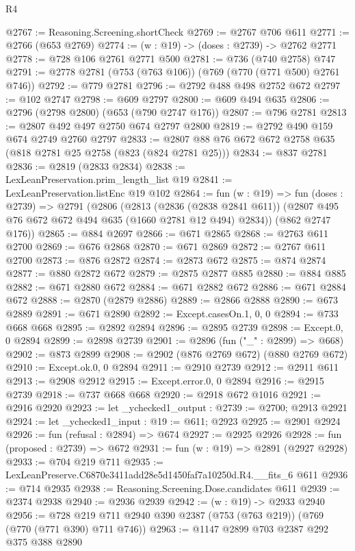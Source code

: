 \begin{lexlean}{R4}
\begin{coremodule}
@2767 := Reasoning.Screening.shortCheck
@2769 := @2767 @706 @611
@2771 := @2766 (@653 @2769)
@2774 := (w : @19) -> (doses : @2739) -> @2762 @2771
@2778 := @728 @106 @2761 @2771 @500
@2781 := @736 (@740 @2758) @747
@2791 := @2778 @2781 (@753 (@763 @106)) (@769 (@770 (@771 @500) @2761 @746))
@2792 := @779 @2781
@2796 := @2792 @488 @498 @2752 @672
@2797 := @102 @2747
@2798 := @609 @2797
@2800 := @609 @494 @635
@2806 := @2796 (@2798 @2800) (@653 (@790 @2747 @176))
@2807 := @796 @2781
@2813 := @2807 @492 @497 @2750 @674 @2797 @2800
@2819 := @2792 @490 @159 @674 @2749 @2760 @2797
@2833 := @2807 @88 @76 @672 @672 @2758 @635 (@818 @2781 @25 @2758 (@823 (@824 @2781 @25)))
@2834 := @837 @2781
@2836 := @2819 (@2833 @2834)
@2838 := LexLeanPreservation.prim_length_list @19
@2841 := LexLeanPreservation.listEnc @19 @102
@2864 := fun (w : @19) =>
  fun (doses : @2739) =>
  @2791
    (@2806
      (@2813
        (@2836 (@2838 @2841 @611))
        (@2807 @495 @76 @672 @672 @494 @635 (@1660 @2781 @12 @494) @2834))
      (@862 @2747 @176))
@2865 := @884 @2697
@2866 := @671 @2865
@2868 := @2763 @611 @2700
@2869 := @676 @2868
@2870 := @671 @2869
@2872 := @2767 @611 @2700
@2873 := @876 @2872
@2874 := @2873 @672
@2875 := @874 @2874
@2877 := @880 @2872 @672
@2879 := @2875 @2877 @885
@2880 := @884 @885
@2882 := @671 @2880 @672
@2884 := @671 @2882 @672
@2886 := @671 @2884 @672
@2888 := @2870 (@2879 @2886)
@2889 := @2866 @2888
@2890 := @673 @2889
@2891 := @671 @2890
@2892 := Except.casesOn.{1, 0, 0}
@2894 := @733 @668 @668
@2895 := @2892 @2894
@2896 := @2895 @2739
@2898 := Except.{0, 0} @2894
@2899 := @2898 @2739
@2901 := @2896 (fun ("_" : @2899) => @668)
@2902 := @873 @2899
@2908 := @2902 (@876 @2769 @672) (@880 @2769 @672)
@2910 := Except.ok.{0, 0} @2894
@2911 := @2910 @2739
@2912 := @2911 @611
@2913 := @2908 @2912
@2915 := Except.error.{0, 0} @2894
@2916 := @2915 @2739
@2918 := @737 @668 @668
@2920 := @2918 @672 @1016
@2921 := @2916 @2920
@2923 := let _ychecked1_output : @2739 := @2700; @2913 @2921
@2924 := let _ychecked1_input : @19 := @611; @2923
@2925 := @2901 @2924
@2926 := fun (refusal : @2894) => @674
@2927 := @2925 @2926
@2928 := fun (proposed : @2739) => @672
@2931 := fun (w : @19) => @2891 (@2927 @2928)
@2933 := @704 @219 @711
@2935 := LexLeanPreserve.C6870e3411add28e5d1450faf7a10250d.R4.__fits_6 @611
@2936 := @714 @2935
@2938 := Reasoning.Screening.Dose.candidates @611
@2939 := @2374 @2938
@2940 := @2936 @2939
@2942 := (w : @19) -> @2933 @2940
@2956 := @728 @219 @711 @2940 @390 @2387 (@753 (@763 @219)) (@769 (@770 (@771 @390) @711 @746))
@2963 := @1147 @2899 @703 @2387 @292 @375 @388 @2890

\end{coremodule}
\end{lexlean}
